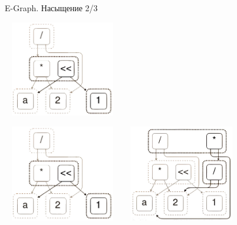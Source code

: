 \documentclass[aspectratio=169
  , xcolor={svgnames}
  , russian  %
  ]{beamer}
\begin{document}
\begin{frame}{E-Graph. Насыщение 2/3}
    {
        \begin{center}
            \includegraphics[width=5.2cm, height=4.2cm]{misc/egraphs_images/egraph_2.jpg}
        \end{center}
    }
    {
        \begin{center}
            \includegraphics[width=5.2cm, height=4.2cm]{misc/egraphs_images/egraph_2.jpg}
            \hspace{0.5cm}
            \hspace{0.5cm}
            \includegraphics[width=5.2cm, height=4.2cm]{misc/egraphs_images/egraph_3.jpg}
        \end{center}
    }
\end{frame}
\end{document}
